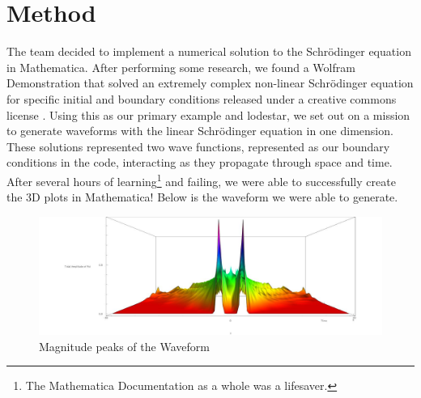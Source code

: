 \documentclass[12pt]{article}
\begin{document}
\section{Method}
The team decided to implement a numerical solution to the Schr\"{o}dinger equation in Mathematica. After performing some research, we found a Wolfram Demonstration that solved an extremely complex non-linear Schr\"{o}dinger equation for specific initial and boundary conditions released under a creative commons license \cite{nonLinearMath}. Using this as our primary example and lodestar, we set out on a mission to generate waveforms with the linear Schr\"{o}dinger equation in one dimension. These solutions represented two wave functions, represented as our boundary conditions in the code, interacting as they propagate through space and time.  After several hours of learning\footnote{The Mathematica Documentation as a whole was a lifesaver.} and failing, we were able to successfully create the 3D plots in Mathematica! Below is the waveform we were able to generate.
\begin{figure}
    \centering
    \hspace{-2cm}
    \includegraphics[width=350pt]{MATH_646_Project_Group_4/frontView.jpg}
    \caption{Magnitude peaks of the Waveform}
    \label{Peaksview}
\end{figure}
\end{document}
